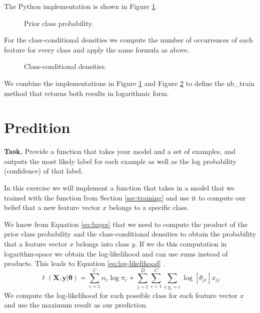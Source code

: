 \documentclass{support/acm_proc_article-sp}
\begin{document}
    The Python implementation is shown in Figure \ref{fig:prior}.
    \begin{figure}[htbp]
        \centering
        \lstset{numbers=none,xleftmargin=0em}
        
        \caption{Prior class probability.}
        \label{fig:prior}
    \end{figure}

    For the class-conditional densities we compute the number of occurrences of each feature for every class and apply
    the same formula as above.
    \begin{figure}[htbp]
        \centering
        \lstset{numbers=none,xleftmargin=0em}
        
        \caption{Class-conditional densities.}
        \label{fig:cc-densities}
    \end{figure}

    We combine the implementations in Figure \ref{fig:prior} and Figure \ref{fig:cc-densities} to define the nb\_train
    method that returns both results in logarithmic form.


    \section{Predition}
    \label{sec:prediction}

    \textbf{Task.} Provide a function that takes your model and a set of examples, and outputs the most likely label for
    each example as well as the log probability (confidence) of that label.

    In this exercise we will implement a function that takes in a model that we trained with the function from Section \ref{sec:training}
    and use it to compute our belief that a new feature vector $x$ belongs to a specific class.

    We know from Equation \ref{eq:bayes} that we need to compute the product of the prior class probability and the class-conditional
    densities to obtain the probability that a feature vector $x$ belongs into class $y$.
    If we do this computation in logarithm-space we obtain the log-likelihood and can use sums instead of products.
    This leads to Equation \ref{eq:log-likelihood} \cite[p.83]{Murphy:2012:MLP:2380985}.
    \begin{equation}
        \ell(\mathbf{X}, \mathbf{y} | \mathbf{\theta}) = \sum_{c = 1}^C n_c \log \pi_c + \sum_{j = 1}^D \sum_{c = 1}^C \sum_{i: y_i = c} \log [\theta_{jc}] x_{ij}
        \label{eq:log-likelihood}
    \end{equation}
    We compute the log-likelihood for each possible class for each feature vector $x$ and use the maximum result as
    our prediction.
\end{document}
